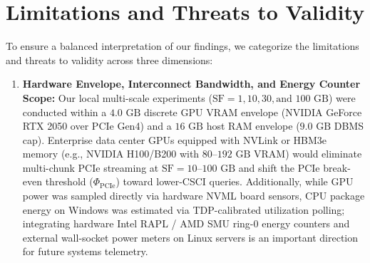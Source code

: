 \documentclass[10pt,a4paper]{article}
\begin{document}
\section{Limitations and Threats to Validity}
To ensure a balanced interpretation of our findings, we categorize the limitations and threats to validity across three dimensions:
\begin{enumerate}[leftmargin=1.5em,itemsep=2pt]
    \item \textbf{Hardware Envelope, Interconnect Bandwidth, and Energy Counter Scope:} Our local multi-scale experiments ($\text{SF}=1, 10, 30, \text{and } 100\text{ GB}$) were conducted within a $4.0\text{ GB}$ discrete GPU VRAM envelope (NVIDIA GeForce RTX 2050 over PCIe Gen4) and a $16\text{ GB}$ host RAM envelope ($9.0\text{ GB}$ DBMS cap). Enterprise data center GPUs equipped with NVLink or HBM3e memory (e.g., NVIDIA H100/B200 with $80\text{--}192\text{ GB}$ VRAM) would eliminate multi-chunk PCIe streaming at $\text{SF}=10\text{--}100\text{ GB}$ and shift the PCIe break-even threshold ($\Phi_{\text{PCIe}}$) toward lower-CSCI queries. Additionally, while GPU power was sampled directly via hardware NVML board sensors, CPU package energy on Windows was estimated via TDP-calibrated utilization polling; integrating hardware Intel RAPL / AMD SMU ring-0 energy counters and external wall-socket power meters on Linux servers is an important direction for future systems telemetry.

\end{enumerate}
\end{document}

